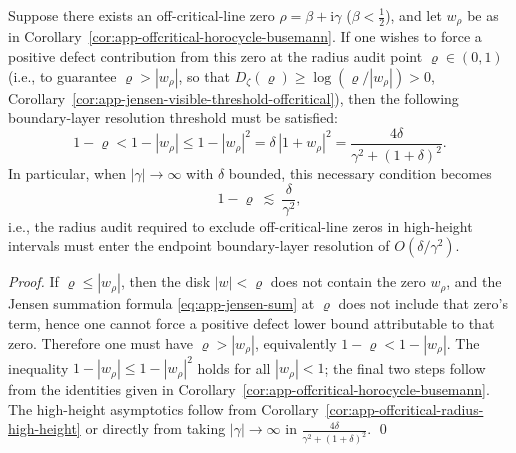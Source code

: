 \begin{corollary}\label{cor:app-horocycle-visible-resolution}
Suppose there exists an off-critical-line zero \(\rho=\beta+\mathrm{i}\gamma\) (\(\beta<\tfrac12\)), and let \(w_{\rho}\) be as in Corollary~\ref{cor:app-offcritical-horocycle-busemann}.
If one wishes to force a positive defect contribution from this zero at the radius audit point \(\varrho\in(0,1)\) (i.e., to guarantee \(\varrho>|w_{\rho}|\), so that \(D_{\zeta}(\varrho)\ge \log(\varrho/|w_{\rho}|)>0\), Corollary~\ref{cor:app-jensen-visible-threshold-offcritical}), then the following boundary-layer resolution threshold must be satisfied:
\[
1-\varrho<1-|w_{\rho}|
\le 1-|w_{\rho}|^{2}
=\delta\,|1+w_{\rho}|^{2}
=\frac{4\delta}{\gamma^{2}+(1+\delta)^{2}}.
\]
In particular, when \(|\gamma|\to\infty\) with \(\delta\) bounded, this necessary condition becomes
\[
1-\varrho\ \lesssim\ \frac{\delta}{\gamma^{2}},
\]
i.e., the radius audit required to exclude off-critical-line zeros in high-height intervals must enter the endpoint boundary-layer resolution of \(O(\delta/\gamma^{2})\).
\end{corollary}

\begin{proof}
If \(\varrho\le |w_{\rho}|\), then the disk \(|w|<\varrho\) does not contain the zero \(w_{\rho}\), and the Jensen summation formula \eqref{eq:app-jensen-sum} at \(\varrho\) does not include that zero's term, hence one cannot force a positive defect lower bound attributable to that zero.
Therefore one must have \(\varrho>|w_{\rho}|\), equivalently \(1-\varrho<1-|w_{\rho}|\).
The inequality \(1-|w_{\rho}|\le 1-|w_{\rho}|^{2}\) holds for all \(|w_{\rho}|<1\); the final two steps follow from the identities given in Corollary~\ref{cor:app-offcritical-horocycle-busemann}.
The high-height asymptotics follow from Corollary~\ref{cor:app-offcritical-radius-high-height} or directly from taking \(|\gamma|\to\infty\) in \(\frac{4\delta}{\gamma^{2}+(1+\delta)^{2}}\). \qed
\end{proof}

\endinput
